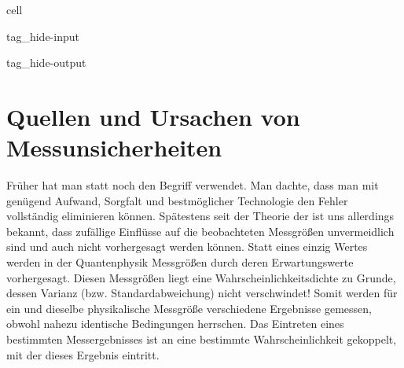 \documentclass[letterpaper,10pt,english]{jupyterBook}
\begin{document}
\sphinxAtStartPar
{}

\sphinxstepscope

\begin{sphinxuseclass}{cell}
\begin{sphinxuseclass}{tag_hide-input}
\begin{sphinxuseclass}{tag_hide-output}
\end{sphinxuseclass}
\end{sphinxuseclass}
\end{sphinxuseclass}

\section{Quellen und Ursachen von Messunsicherheiten}
\label{\detokenize{content/1_Messunsicherheiten:quellen-und-ursachen-von-messunsicherheiten}}\label{\detokenize{content/1_Messunsicherheiten::doc}}
\sphinxAtStartPar
Früher hat man statt  noch den Begriff  verwendet. Man dachte, dass man mit genügend Aufwand, Sorgfalt und bestmöglicher Technologie den Fehler vollständig eliminieren können. Spätestens seit der Theorie der  ist uns allerdings bekannt, dass zufällige Einflüsse auf die beobachteten Messgrößen  unvermeidlich sind und auch nicht vorhergesagt werden können. Statt eines einzig  Wertes werden in der Quantenphysik Messgrößen durch deren Erwartungswerte vorhergesagt. Diesen Messgrößen liegt eine Wahrscheinlichkeitsdichte zu Grunde, dessen Varianz (bzw. Standardabweichung) nicht verschwindet! Somit werden für ein und dieselbe physikalische Messgröße verschiedene Ergebnisse gemessen, obwohl nahezu identische Bedingungen herrschen. Das Eintreten eines bestimmten Messergebnisses ist an eine bestimmte Wahrscheinlichkeit gekoppelt, mit der dieses Ergebnis eintritt.
\end{document}

